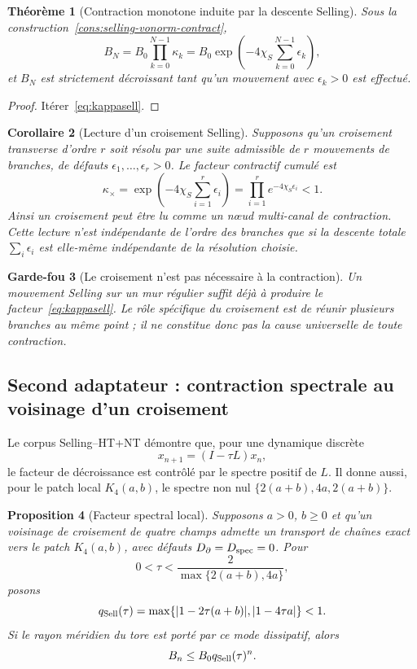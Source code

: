 \documentclass[11pt,a4paper]{article}
\newtheorem{theorem}{Théorème}[section]
\newtheorem{proposition}[theorem]{Proposition}
\newtheorem{corollary}[theorem]{Corollaire}
\newtheorem{guardrail}[theorem]{Garde-fou}
\begin{document}
\begin{theorem}[Contraction monotone induite par la descente Selling]\label{thm:selling-contract}
Sous la construction~\ref{cons:selling-vonorm-contract},
\[
 B_N=B_0\prod_{k=0}^{N-1}\kappa_k
 =B_0\exp\left(-4\chi_S\sum_{k=0}^{N-1}\epsilon_k\right),
\]
et $B_N$ est strictement décroissant tant qu'un mouvement avec $\epsilon_k>0$ est effectué.
\end{theorem}

\begin{proof}
Itérer~\eqref{eq:kappasell}.
\end{proof}

\begin{corollary}[Lecture d'un croisement Selling]\label{cor:crossing-contract}
Supposons qu'un croisement transverse d'ordre $r$ soit résolu par une suite admissible de $r$ mouvements de branches, de défauts $\epsilon_1,\ldots,\epsilon_r>0$. Le facteur contractif cumulé est
\[
 \kappa_\times=
 \exp\left(-4\chi_S\sum_{i=1}^r\epsilon_i\right)
 =\prod_{i=1}^r e^{-4\chi_S\epsilon_i}<1.
\]
Ainsi un croisement peut être lu comme un \emph{nœud multi-canal de contraction}. Cette lecture n'est indépendante de l'ordre des branches que si la descente totale $\sum_i\epsilon_i$ est elle-même indépendante de la résolution choisie.
\end{corollary}

\begin{guardrail}[Le croisement n'est pas nécessaire à la contraction]
Un mouvement Selling sur un mur régulier suffit déjà à produire le facteur~\eqref{eq:kappasell}. Le rôle spécifique du croisement est de réunir plusieurs branches au même point ; il ne constitue donc pas la cause universelle de toute contraction.
\end{guardrail}

\subsection{Second adaptateur : contraction spectrale au voisinage d'un croisement}

Le corpus Selling--HT+NT démontre que, pour une dynamique discrète
\[
 x_{n+1}=(I-\tau L)x_n,
\]
le facteur de décroissance est contrôlé par le spectre positif de $L$. Il donne aussi, pour le patch local $K_4(a,b)$, le spectre non nul $\{2(a+b),4a,2(a+b)\}$.

\begin{proposition}[Facteur spectral local]\label{prop:selling-spectral-contract}
Supposons $a>0$, $b\ge0$ et qu'un voisinage de croisement de quatre champs admette un transport de chaînes exact vers le patch $K_4(a,b)$, avec défauts $D_\partial=D_{\rm spec}=0$. Pour
\[
 0<\tau<\frac{2}{\max\{2(a+b),4a\}},
\]
posons
\begin{equation}\label{eq:qSell}
 q_{\rm Sell}(\tau)
 =\max\{|1-2\tau(a+b)|,|1-4\tau a|\}<1.
\end{equation}
Si le rayon méridien du tore est porté par ce mode dissipatif, alors
\[
 B_n\le B_0q_{\rm Sell}(\tau)^n.
\]
\end{proposition}
\end{document}
